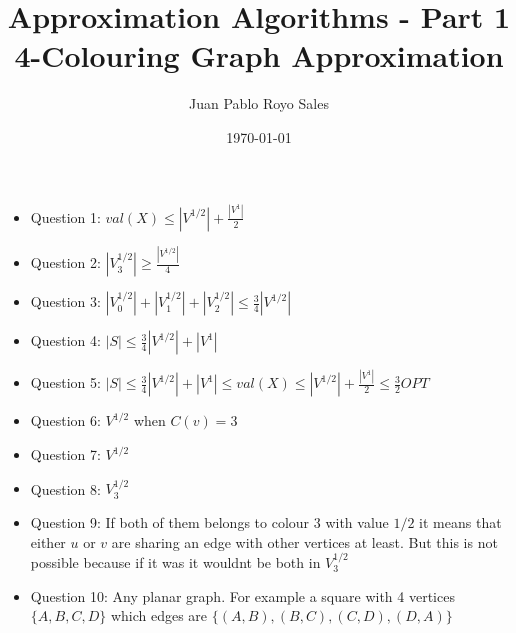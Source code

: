 \documentclass[12pt, a4paper]{article}
\title{%
      Approximation Algorithms - Part 1 \\
      4-Colouring Graph Approximation
}
\author{%
  Juan Pablo Royo Sales
}
\date\today
\begin{document}
\begin{itemize}
  \item Question 1: $val(X) \leq |V^{1/2}| + \frac{|V^1|}{2}$
  \item Question 2: $|V_{3}^{1/2}| \geq \frac{|V^{1/2}|}{4}$
  \item Question 3: $|V_{0}^{1/2}| + |V_{1}^{1/2}| + |V_{2}^{1/2}| \leq \frac{3}{4}|V^{1/2}|$
  \item Question 4: $|S| \leq \frac{3}{4}|V^{1/2}| + |V^1|$
  \item Question 5: $|S| \leq \frac{3}{4}|V^{1/2}| + |V^1| \leq val(X) \leq |V^{1/2}| + \frac{|V^1|}{2} \leq \frac{3}{2}OPT$
  \item Question 6: $V^{1/2}$ when $C(v) = 3$
  \item Question 7: $V^{1/2}$
  \item Question 8: $V_3^{1/2}$
  \item Question 9: If both of them belongs to colour $3$ with value $1/2$ it means that either $u$ or $v$ are sharing an edge with other vertices at least. But this is not possible because if it was it wouldnt be both in $V_3^{1/2}$
  \item Question 10: Any planar graph. For example a square with 4 vertices $\{A,B,C,D\}$ which edges are $\{(A,B), (B,C), (C,D), (D,A)\}$ 
\end{itemize}
\end{document}
